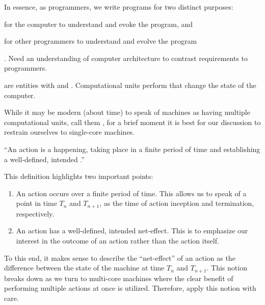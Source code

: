 In essence, as programmers, we write programs for two distinct purposes:
\begin{inparaenum}[(1)] \item for the computer to understand and evoke the
program, and \item for other programmers to understand and evolve the
program\end{inparaenum}. Need an understanding of computer architecture to
contrast requirements to programmers.

\begin{definition}

 are entities with  and .
Computational units perform  that change the state of the
computer.

\end{definition}

While it may be modern (about time) to speak of machines as having multiple
computational units, call them , for a brief moment it is best for
our discussion to restrain ourselves to single-core machines.

\begin{definition}

``An action is a happening, taking place in a finite period of time and
establishing a well-defined, intended .''
\cite{dijkstra-introduction}

\end{definition}

This definition highlights two important points:

\begin{enumerate}

\item An action occurs over a finite period of time. This allows us to speak of
a point in time $T_n$ and $T_{n+1}$, as the time of action inception and
termination, respectively.

\item An action has a well-defined, intended net-effect. This is to emphasize
our interest in the outcome of an action rather than the action itself.

\end{enumerate}

To this end, it makes sense to describe the ``net-effect'' of an action as the
difference between the state of the machine at time $T_n$ and $T_{n+1}$. This
notion breaks down as we turn to multi-core machines where the clear benefit of
performing multiple actions at once is utilized. Therefore, apply this notion
with care.

